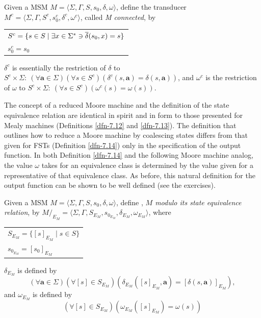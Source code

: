 \begin{dfn}\label{dfn-7.24}
Given a MSM $M=\langle\Sigma,\Gamma,S,s_0,\delta,\omega\rangle$, define the
transducer $M^c =\langle\Sigma,\Gamma,S^c,s^c_0,\delta^c,\omega^c\rangle$,
called \emph{M connected}, by
\begin{center}\begin{tabular}{l}
$S^c=\{s \in S \mid \exists x \in \Sigma^* \ni \overline{\delta}(s_0,x) = s\}$ \\
$s^c_0 = s_0$
\end{tabular}\end{center}
$\delta^c$ is essentially the restriction of $\delta$ to $S^c \times \Sigma:\
(\forall\pmb{a}\in\Sigma)(\forall s \in S^c)(\delta^c(s,\pmb{a}) =
\delta(s,\pmb{a}))$, and $\omega^c$ is the restriction of $\omega$ to
$S^c \times \Sigma:\ (\forall s \in S^c)(\omega^c(s) = \omega(s))$.
\end{dfn}

The concept of a reduced Moore machine and the definition of the state
equivalence relation are identical in spirit and in form to those presented
for Mealy machines (Definitions \ref{dfn-7.12} and \ref{dfn-7.13}). The definition that outlines
how to reduce a Moore machine by coalescing states differs from that given for
FSTs (Definition \ref{dfn-7.14}) only in the specification of the output function. In
both Definition \ref{dfn-7.14} and the following Moore machine analog, the value $\omega$
takes for an equivalence class is determined by the value given for a
representative of that equivalence class. As before, this natural definition for
the output function can be shown to be well defined (see the exercises).

\begin{dfn}\label{dfn-7.25}
Given a MSM $M=\langle\Sigma,\Gamma,S,s_0,\delta,\omega\rangle$, define
\Index{M$/  _{E_M}$}, \emph{$M$ modulo its state equivalence relation}, by
$M/  _{E_M}=\langle\Sigma,\Gamma,S_{E_M},s_{0_{E_M}},\delta_{E_M},\omega_{E_M}
\rangle$, where
\begin{center}\begin{tabular}{l}
$S_{E_M}=\{[s]_{E_M} \mid  s \in S\}$ \\
$s_{0_{E_M}} = [s_0]_{E_M}$
\end{tabular}\end{center}
$\delta_{E_M}$ is defined by
\[ (\forall\pmb{a}\in\Sigma)(\forall [s] \in S_{E_M})(\delta_{E_M}
	([s]_{E_M},\pmb{a})=[\delta(s,\pmb{a})]_{E_M}), \]
and $\omega_{E_M}$ is defined by
\[ (\forall [s] \in S_{E_M})(\omega_{E_M}([s]_{E_M}) = \omega(s)) \]
\end{dfn}

